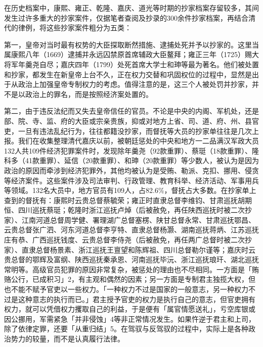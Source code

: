 在历史档案中，康熙、雍正、乾隆、嘉庆、道光等时期的抄家档案存留较多，其间发生过许多重大的抄家案件，仅据笔者查阅及抄录的300余件抄家档案，再结合清代的律例，将这些抄家案件粗分为五类：

第一，皇帝对当时最有权势的大臣探取断然措施、逮捕处死并予以抄家的。这里当属康熙八年（1669）逮捕并永远囚禁原首席辅政大臣鳌拜；雍正三年（1725）赐大将军年羹尧自尽；嘉庆四年（1799）处死首席大学士和珅等最为著名。他们被处置和抄家，都发生在新皇帝上台不久，正在权力交替和巩固权位的过程中，显然是出于从政治上加强皇帝专制权力的考虑。值得注意的是，这三个人被处罚并抄家，并不是以政治上的罪名，而是按照经济案处置的。

\vfill
\begin{BookNotes}
\end{BookNotes}

第二，由于违反法纪而又失去皇帝信任的官员。不论是中央的内阁、军机处，还是部、院、寺、监、府的大臣或宗亲贵族，抑或对地方上省、司、道、府、州、县官吏，一旦有违法乱纪行为，往往都籍没抄家，而督抚等大员的抄家单往往是几次上报。我们在收集整理清代嘉庆以前，被朝廷惩处的中央和地方一二品满汉军政大员132人共109件经济犯罪案件时，发现除年羹尧（92款重罪）、蔡珽（18款重罪）、隆科多（41款重罪）、延信（20款重罪）、和珅（20款重罪）等少数人，被认为是因为政治的原因而牵涉到经济犯罪外，其他均被认为是受贿、勒派、克扣、挪用、侵贪等经济案件。这些案件涉及司法审判、行政管理、教育科举、经济活动、军事用兵等领域。132名大员中，地方官员有109人，占82.6\%，督抚占大多数。在抄家单上查到的督抚有：康熙时云贵总督蔡毓荣；雍正时直隶总督李维钧、甘肃巡抚胡期恒、四川巡抚蔡珽；乾隆时浙江巡抚卢焯（后被赦免，再任陕西巡抚时被二次抄家）、江南河道总督周学健、署理湖广总督塞楞、陕甘总督永常、甘肃巡抚鄂昌、云贵总督张广泗、河东河道总督李亨特、直隶总督杨灏、湖南巡抚蒋炳、江苏巡抚庄有恭、广西巡抚钱度、云贵总督李侍尧（后被赦免，再任两广总督时被二次抄家）、直隶总督杨景素、浙江巡抚王亶望和陈辉祖、四川总督勒尔谨等；嘉庆时云贵总督的鄂辉及富纲、陕西巡抚秦承恩、河南巡抚毕沅、浙江巡抚琅玕、湖北巡抚常明等。高级官员犯罪的原因非常复杂，被惩处的理由也不尽相同。一方面是「贿赂公行，已成积习」2，有主观和偶然的因素；另一方面是专制君主独揽大权，但也不能不赋予官吏以一些权力。「一种权力不过是国家的一般意志，另一种权力不过是这种意志的执行而已。」君主授予官吏的权力是执行自己的意志，但官吏拥有权力，就可以凭借权力攫取自己的利益，于是便有「属官情愿送礼」，亏空库银或因公挪用，军需紧急「并非侵蚀」4等非正常情况发生。如果忤逆于君主和上司，除了依律定罪，还要「从重归结」5。在驾驭与反驾驭的过程中，实际上是各种政治势力的较量，而不是认真履行法律。

